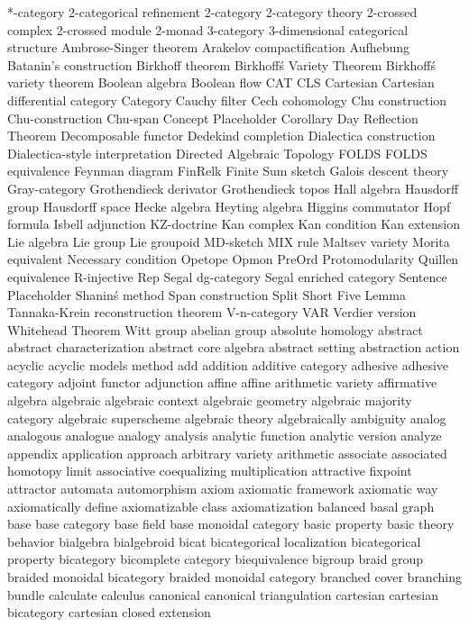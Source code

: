*-category
2-categorical refinement
2-category
2-category theory
2-crossed complex
2-crossed module
2-monad
3-category
3-dimensional categorical structure
Ambrose-Singer theorem
Arakelov compactification
Aufhebung
Batanin's construction
Birkhoff theorem
Birkhoff\'s Variety Theorem
Birkhoff\'s variety theorem
Boolean algebra
Boolean flow
CAT
CLS
Cartesian
Cartesian differential category
Category
Cauchy filter
Cech cohomology
Chu construction
Chu-construction
Chu-span
Concept Placeholder
Corollary
Day Reflection Theorem
Decomposable functor
Dedekind completion
Dialectica construction
Dialectica-style interpretation
Directed Algebraic Topology
FOLDS
FOLDS equivalence
Feynman diagram
FinRelk
Finite Sum sketch
Galois descent theory
Gray-category
Grothendieck derivator
Grothendieck topos
Hall algebra
Hausdorff group
Hausdorff space
Hecke algebra
Heyting algebra
Higgins commutator
Hopf formula
Isbell adjunction
KZ-doctrine
Kan complex
Kan condition
Kan extension
Lie algebra
Lie group
Lie groupoid
MD-sketch
MIX rule
Maltsev variety
Morita equivalent
Necessary condition
Opetope
Opmon
PreOrd
Protomodularity
Quillen equivalence
R-injective
Rep
Segal dg-category
Segal enriched category
Sentence Placeholder
Shanin\'s method
Span construction
Split Short Five Lemma
Tannaka-Krein reconstruction theorem
V-n-category
VAR
Verdier version
Whitehead Theorem
Witt group
abelian group
absolute homology
abstract
abstract characterization
abstract core algebra
abstract setting
abstraction
action
acyclic
acyclic models method
add
addition
additive category
adhesive
adhesive category
adjoint functor
adjunction
affine
affine arithmetic variety
affirmative
algebra
algebraic
algebraic context
algebraic geometry
algebraic majority category
algebraic superscheme
algebraic theory
algebraically
ambiguity
analog
analogous
analogue
analogy
analysis
analytic function
analytic version
analyze
appendix
application
approach
arbitrary variety
arithmetic
associate
associated homotopy limit
associative coequalizing multiplication
attractive fixpoint
attractor
automata
automorphism
axiom
axiomatic framework
axiomatic way
axiomatically define
axiomatizable class
axiomatization
balanced
basal graph
base
base category
base field
base monoidal category
basic property
basic theory
behavior
bialgebra
bialgebroid
bicat
bicategorical localization
bicategorical property
bicategory
bicomplete category
biequivalence
bigroup
braid group
braided monoidal bicategory
braided monoidal category
branched cover
branching
bundle
calculate
calculus
canonical
canonical triangulation
cartesian
cartesian bicategory
cartesian closed extension
